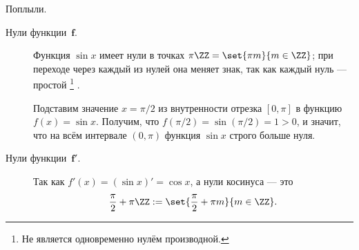 \begin{solution}
\begin{enumerate}[1.]
			Поплыли.
			\begin{description}
				\item[Нули функции~$\bm{f}$.] 
					Функция $\sin{x}$ имеет нули в точках $\pi \ZZ = \set{\pi m}{m \in
					\ZZ}$; при переходе через каждый из нулей она меняет знак, так как
					каждый нуль --- простой%
					\footnote{Не является одновременно нулём производной.}%
					.

					Подставим значение $x = \pi/2$ из внутренности отрезка $[0, \pi]$ в
					функцию $f(x) = \sin{x}$. Получим, что $f(\pi/2) = \sin(\pi/2) = 1 >
					0$, и значит, что на всём интервале $(0, \pi)$ функция $\sin{x}$
					строго больше нуля.

				\item[Нули функции~$\bm{f'}$.]

					Так как $f'(x) = (\sin{x})' = \cos{x}$, а нули косинуса --- это
					\[
						\frac{\pi}{2} + \pi\ZZ :=
						\set{\frac{\pi}{2} + \pi m}{m \in \ZZ}
						.
					\]
			\end{description}
	\end{enumerate}
\end{solution}
